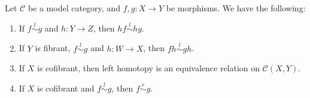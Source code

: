 \documentclass[../thesis.tex]{subfiles}
\begin{document}
            \begin{proposition}\label{prop: basic-homotopy}
                Let $\mathcal{C}$ be a model category, and $f,g:X\rightarrow Y$ be morphisms. We have the following:
                \begin{enumerate}
                    \item If $f \overset{l}{\sim}g$ and $h: Y \rightarrow Z$, then $hf \overset{l}{\sim} hg$.
                    \item If $Y$ is fibrant, $f \overset{l}{\sim} g$ and $h: W \rightarrow X$, then $fh \overset{l}{\sim} gh$.
                    \item If $X$ is cofibrant, then left homotopy is an equivalence relation on $\mathcal{C}(X,Y)$.
                    \item If $X$ is cofibrant and $f \overset{l}{\sim} g$, then $f \overset{r}{\sim} g$.
                \end{enumerate}
            \end{proposition}
\end{document}
